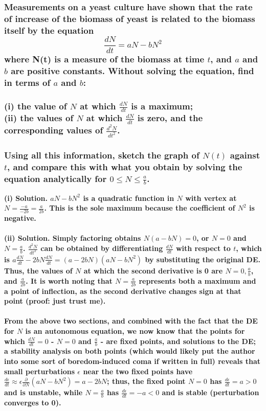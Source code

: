 \documentclass{article}
\begin{document}
\subsubsection*{Measurements on a yeast culture have shown that the rate of increase of the biomass of yeast is related to the biomass itself by the equation \begin{equation*}
    \frac{dN}{dt} = aN - bN^2
\end{equation*}
    where N(t) is a measure of the biomass at time $t$, and $a$ and $b$ are positive constants. Without solving the equation, find in terms of $a$ and $b$: \\ \\
    (i) the value of $N$ at which $\frac{dN}{dt}$ is a maximum; \\
    (ii) the values of $N$ at which $\frac{dN}{dt}$ is zero, and the corresponding values of $\frac{d^2 N}{dt^2}$. \\ \\
    Using all this information, sketch the graph of $N(t)$ against $t$, and compare this with what you obtain by solving the equation analytically for $0 \leq N \leq \frac{a}{b}$.
}
\bf (i) Solution. \normalfont $aN-bN^2$ is a quadratic function in $N$ with vertex at $N = \frac{-a}{-2b} = \frac{a}{2b}$. This is the sole maximum because the coefficient of $N^2$ is negative.
\\ \\
\bf (ii) Solution. \normalfont Simply factoring obtains $N(a-bN)=0$, or $N=0$ and $N=\frac{a}{b}$. $\frac{d^2N}{dt^2}$ can be obtained by differentiating $\frac{dN}{dt}$ with respect to $t$, which is $a \frac{dN}{dt} - 2bN\frac{dN}{dt} = (a-2bN)(aN-bN^2)$ by substituting the original DE. Thus, the values of $N$ at which the second derivative is 0 are $N=0, \frac{a}{b}$, and $\frac{a}{2b}$. It is worth noting that $N=\frac{a}{2b}$ represents both a maximum and a point of inflection, as the second derivative changes sign at that point (proof: just trust me). 
\\ \\
From the above two sections, and combined with the fact that the DE for $N$ is an autonomous equation, we now know that the points for which $\frac{dN}{dt} = 0$ - $N = 0$ and $\frac{a}{b}$ - are fixed points, and solutions to the DE; a stability analysis on both points (which would likely put the author into some sort of boredom-induced coma if written in full) reveals that small perturbations $\epsilon$ near the two fixed points have $\frac{d\epsilon}{dt} \approx \epsilon \frac{\partial}{\partial N }(aN - bN^2) = a - 2bN$; thus, the fixed point $N=0$ has $\frac{d\epsilon}{dt} = a > 0$ and is unstable, while $N=\frac{a}{b}$ has $\frac{d\epsilon}{dt} = -a <0$ and is stable (perturbation converges to 0). \\ \\
\end{document}
